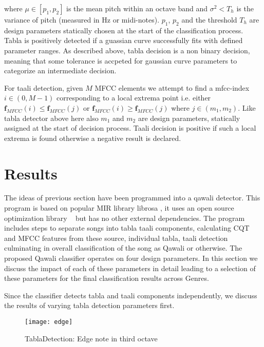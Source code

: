\documentclass{article}
\begin{document}
where $\mu \in [p_{1}, p_{2}]$ is the mean pitch within an octave band and $\sigma^{2} < T_{h}$ is the variance of pitch (measured in Hz or midi-notes). $p_{1}$, $p_{2}$ and the threshold $T_{h}$ are design parameters statically chosen at the start of the classification process. Tabla is positively detected if a guassian curve successfully fits with defined parameter ranges. As described above, tabla decision is a non binary decision, meaning that some tolerance is accpeted for gaussian curve parameters to categorize an intermediate decision.

For taali detection, given $M$ MFCC elements we attempt to find a mfcc-index $i \in (0, M-1)$ corresponding to a local extrema point i.e. either $\boldsymbol{f}_{MFCC}(i) \leq \boldsymbol{f}_{MFCC}(j)$ or $\boldsymbol{f}_{MFCC}(i) \geq \boldsymbol{f}_{MFCC}(j)$ where $j \in (m_{1}, m_{2})$. Like tabla detector above here also $m_{1}$ and $m_{2}$ are design parameters, statically assigned at the start of decision process. Taali decision is positive if such a local extrema is found otherwise a negative result is declared.

\section{Results}\label{sec:result}

The ideas of previous section have been programmed into a qawali detector. This program is based on popular MIR library librosa  \citep{brian_mcfee_2022_6097378}, it uses an open source optimization library ~\citep{newville_matthew_2014} but has no other external dependencies. The program includes steps to separate songs into tabla taali components, calculating CQT and MFCC features from these source, individual tabla, taali detection culminating in overall classification of the song as Qawali or otherwise. The proposed Qawali classifier operates on four design parameters. In this section we discuss the impact of each of these parameters in detail leading to a selection of these parameters for the final classification results across Genres.

Since the classifier detects tabla and taali components independently, we discuss the results of varying tabla detection parameters first.
\begin{figure}[htbp]
  \centering
  \texttt{[image: edge]}
  \caption{TablaDetection: Edge note in third octave}
\label{fig:src_edge}
\end{figure}
\end{document}
